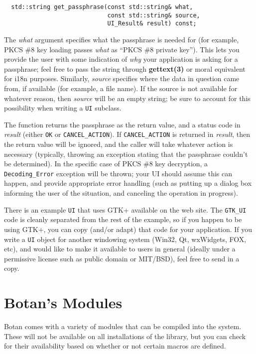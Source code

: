 \documentclass{article}
\newcommand{\function}[1]{\textbf{#1}}
\newcommand{\type}[1]{\texttt{#1}}
\renewcommand{\arg}[1]{\textsl{#1}}
\begin{document}
\begin{verbatim}
  std::string get_passphrase(const std::string& what,
                             const std::string& source,
                             UI_Result& result) const;
\end{verbatim}

The \arg{what} argument specifies what the passphrase is needed for (for
example, PKCS \#8 key loading passes \arg{what} as ``PKCS \#8 private
key''). This lets you provide the user with some indication of \emph{why} your
application is asking for a passphrase; feel free to pass the string through
\function{gettext(3)} or moral equivalent for i18n purposes. Similarly,
\arg{source} specifies where the data in question came from, if available (for
example, a file name). If the source is not available for whatever reason, then
\arg{source} will be an empty string; be sure to account for this possibility
when writing a \type{UI} subclass.

The function returns the passphrase as the return value, and a status code in
\arg{result} (either \type{OK} or \type{CANCEL\_ACTION}). If
\type{CANCEL\_ACTION} is returned in \arg{result}, then the return value will
be ignored, and the caller will take whatever action is necessary (typically,
throwing an exception stating that the passphrase couldn't be determined). In
the specific case of PKCS \#8 key decryption, a \type{Decoding\_Error}
exception will be thrown; your UI should assume this can happen, and provide
appropriate error handling (such as putting up a dialog box informing the user
of the situation, and canceling the operation in progress).

There is an example \type{UI} that uses GTK+ available on the web site. The
\type{GTK\_UI} code is cleanly separated from the rest of the example, so if
you happen to be using GTK+, you can copy (and/or adapt) that code for your
application. If you write a \type{UI} object for another windowing system
(Win32, Qt, wxWidgets, FOX, etc), and would like to make it available to users
in general (ideally under a permissive license such as public domain or
MIT/BSD), feel free to send in a copy.

\section{Botan's Modules}

Botan comes with a variety of modules that can be compiled into the system.
These will not be available on all installations of the library, but you can
check for their availability based on whether or not certain macros are
defined.
\end{document}

